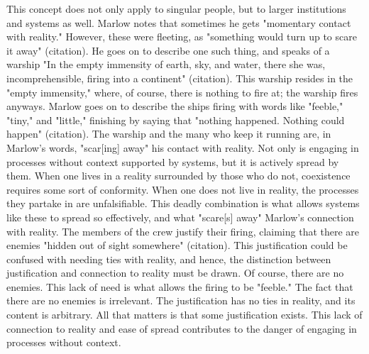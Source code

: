 \documentclass[letterpaper]{article}
\begin{document}
This concept does not only apply to singular people, but to larger
institutions and systems as well. Marlow notes that sometimes he gets
"momentary contact with reality." However, these were fleeting, as
"something would turn up to scare it away" (citation). He goes on to
describe one such thing, and speaks of a warship "In the empty immensity
of earth, sky, and water, there she was, incomprehensible, firing into a
continent" (citation). This warship resides in the "empty immensity,"
where, of course, there is nothing to fire at; the warship fires
anyways. Marlow goes on to describe the ships firing with words like
"feeble," "tiny," and "little," finishing by saying that "nothing
happened. Nothing could happen" (citation). The warship and the many who
keep it running are, in Marlow's words, "scar[ing] away" his contact
with reality. Not only is engaging in processes without context
supported by systems, but it is actively spread by them. When one lives
in a reality surrounded by those who do not, coexistence requires some
sort of conformity. When one does not live in reality, the processes
they partake in are unfalsifiable. This deadly combination is what
allows systems like these to spread so effectively, and what "scare[s]
away" Marlow's connection with reality. The members of the crew justify
their firing, claiming that there are enemies "hidden out of sight
somewhere" (citation). This justification could be confused with needing
ties with reality, and hence, the distinction between justification and
connection to reality must be drawn. Of course, there are no enemies.
This lack of need is what allows the firing to be "feeble." The fact
that there are no enemies is irrelevant. The justification has no ties
in reality, and its content is arbitrary. All that matters is that some
justification exists. This lack of connection to reality and ease of
spread contributes to the danger of engaging in processes without
context.
\end{document}
